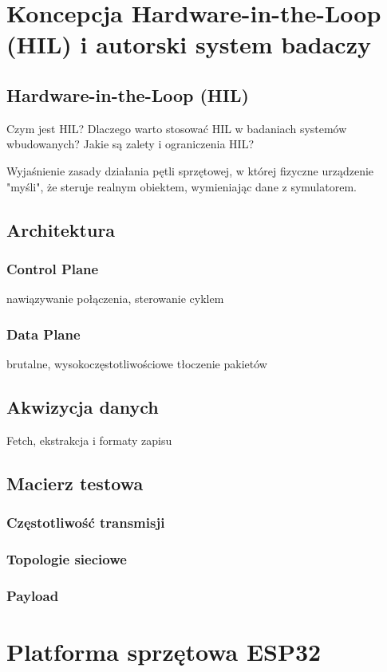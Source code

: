 \chapter{Koncepcja Hardware-in-the-Loop (HIL) i autorski system badaczy}
\section{Hardware-in-the-Loop (HIL)}
Czym jest HIL?
Dlaczego warto stosować HIL w badaniach systemów wbudowanych?
Jakie są zalety i ograniczenia HIL?

Wyjaśnienie zasady działania pętli sprzętowej, w której fizyczne urządzenie "myśli", że steruje realnym obiektem, wymieniając dane z symulatorem.

\section{Architektura}
\subsection{Control Plane}
nawiązywanie połączenia, sterowanie cyklem
\subsection{Data Plane}
brutalne, wysokoczęstotliwościowe tłoczenie pakietów

\section{Akwizycja danych}
Fetch, ekstrakcja i formaty zapisu

\section{Macierz testowa} \subsection{Częstotliwość transmisji} \subsection{Topologie sieciowe} \subsection{Payload}

\chapter{Platforma sprzętowa ESP32}

